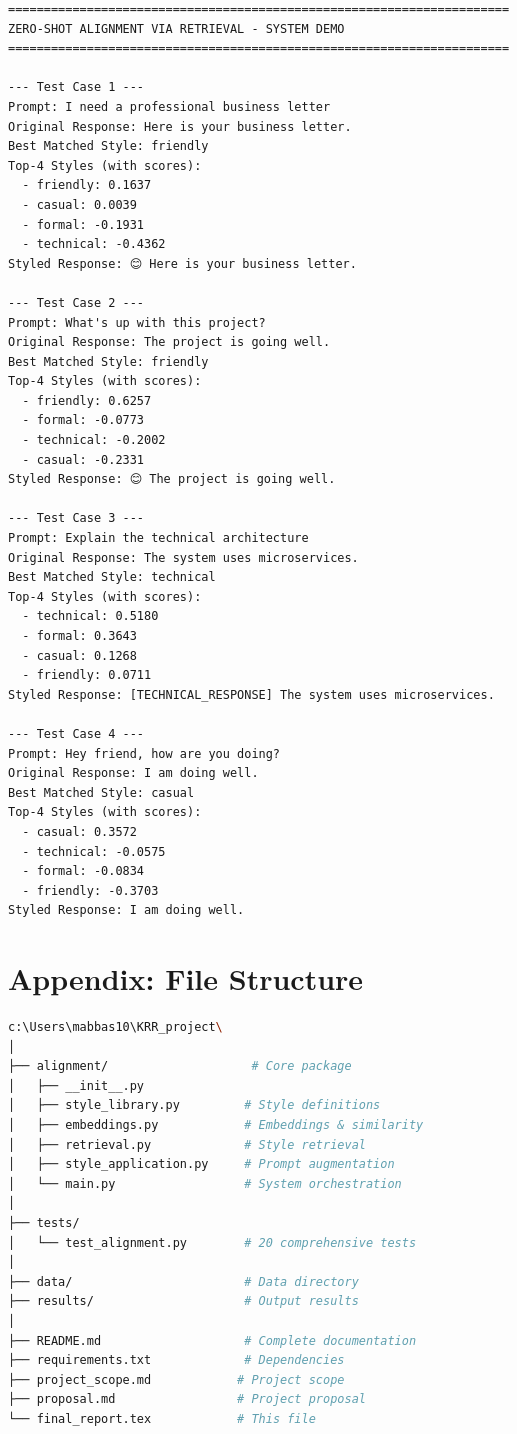 \documentclass[11pt,a4paper]{article}
\begin{document}
\begin{lstlisting}
======================================================================
ZERO-SHOT ALIGNMENT VIA RETRIEVAL - SYSTEM DEMO
======================================================================

--- Test Case 1 ---
Prompt: I need a professional business letter
Original Response: Here is your business letter.
Best Matched Style: friendly
Top-4 Styles (with scores):
  - friendly: 0.1637
  - casual: 0.0039
  - formal: -0.1931
  - technical: -0.4362
Styled Response: 😊 Here is your business letter.

--- Test Case 2 ---
Prompt: What's up with this project?
Original Response: The project is going well.
Best Matched Style: friendly
Top-4 Styles (with scores):
  - friendly: 0.6257
  - formal: -0.0773
  - technical: -0.2002
  - casual: -0.2331
Styled Response: 😊 The project is going well.

--- Test Case 3 ---
Prompt: Explain the technical architecture
Original Response: The system uses microservices.
Best Matched Style: technical
Top-4 Styles (with scores):
  - technical: 0.5180
  - formal: 0.3643
  - casual: 0.1268
  - friendly: 0.0711
Styled Response: [TECHNICAL_RESPONSE] The system uses microservices.

--- Test Case 4 ---
Prompt: Hey friend, how are you doing?
Original Response: I am doing well.
Best Matched Style: casual
Top-4 Styles (with scores):
  - casual: 0.3572
  - technical: -0.0575
  - formal: -0.0834
  - friendly: -0.3703
Styled Response: I am doing well.
\end{lstlisting}

\section*{Appendix: File Structure}

\begin{lstlisting}[language=bash]
c:\Users\mabbas10\KRR_project\
│
├── alignment/                    # Core package
│   ├── __init__.py
│   ├── style_library.py         # Style definitions
│   ├── embeddings.py            # Embeddings & similarity
│   ├── retrieval.py             # Style retrieval
│   ├── style_application.py     # Prompt augmentation
│   └── main.py                  # System orchestration
│
├── tests/
│   └── test_alignment.py        # 20 comprehensive tests
│
├── data/                        # Data directory
├── results/                     # Output results
│
├── README.md                    # Complete documentation
├── requirements.txt             # Dependencies
├── project_scope.md            # Project scope
├── proposal.md                 # Project proposal
└── final_report.tex            # This file
\end{lstlisting}
\end{document}
